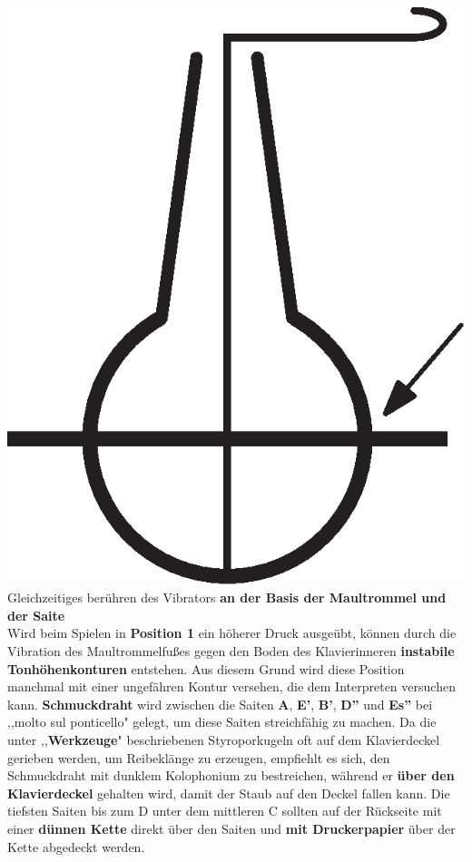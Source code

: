 \documentclass[12pt]{article}
\newcommand*\circled[1]{\tikz[baseline=(char.base)]{
            \node[shape=circle,draw,inner sep=1pt] (char) {#1};}}
\begin{document}
\includegraphics[scale=0.13]{string.eps}
\circled{3} Gleichzeitiges berühren des Vibrators \textbf{an der Basis der Maultrommel und der Saite} \\

Wird beim Spielen in \textbf{Position 1} ein höherer Druck ausgeübt, können durch die Vibration des Maultrommelfußes gegen den Boden des Klavierinneren \textbf{instabile Tonhöhenkonturen} entstehen. Aus diesem Grund wird diese Position manchmal mit einer ungefähren Kontur versehen, die dem Interpreten versuchen kann. \textbf{\circled{4} Schmuckdraht} wird zwischen die Saiten \textbf{A}, \textbf{E'}, \textbf{B'}, \textbf{D''} und \textbf{Es''} bei ,,molto sul ponticello" gelegt, um diese Saiten streichfähig zu machen. Da die unter ,,\textbf{Werkzeuge}" beschriebenen Styroporkugeln oft auf dem Klavierdeckel gerieben werden, um Reibeklänge zu erzeugen, empfiehlt es sich, den Schmuckdraht mit dunklem Kolophonium zu bestreichen, während er \textbf{über den Klavierdeckel} gehalten wird, damit der Staub auf den Deckel fallen kann. \textbf{\circled{5}} Die tiefsten Saiten bis zum D unter dem mittleren C sollten auf der Rückseite mit einer \textbf{dünnen Kette} direkt über den Saiten und \textbf{mit Druckerpapier} über der Kette abgedeckt werden.
\endgroup
\end{document}
